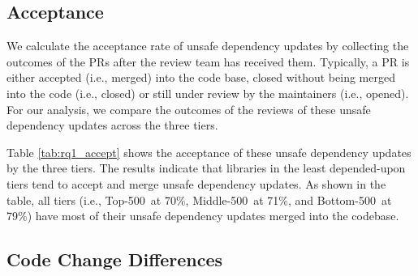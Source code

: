 \documentclass[sigconf,screen]{acmart}
\newcommand\toppkg{Top-500}
\newcommand\midpkg{Middle-500}
\newcommand\lowpkg{Bottom-500}
\begin{document}
\begin{sloppy}
\subsection{Acceptance} 

We calculate the acceptance rate of unsafe dependency updates by collecting the outcomes of the PRs after the review team has received them.
Typically, a PR is either accepted (i.e., merged) into the code base, closed without being merged into the code (i.e., closed) or still under review by the maintainers (i.e., opened).  
For our analysis, we compare the outcomes of the reviews of these unsafe dependency updates across the three tiers.

Table \ref{tab:rq1_accept} shows the acceptance of these unsafe dependency updates by the three tiers.
The results indicate that libraries in the least depended-upon tiers tend to accept and merge unsafe dependency updates.
As shown in the table, all tiers (i.e., \toppkg~at 70\%, \midpkg~at 71\%, and \lowpkg~at 79\%) have most of their unsafe dependency updates merged into the codebase. 


\subsection{Code Change Differences}


\end{sloppy}
\end{document}
